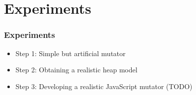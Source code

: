 %
%
\section{Experiments}


\begin{frame}
	\frametitle{Experiments}
	\begin{itemize}
		\item Step 1: Simple but artificial mutator
		\item Step 2: Obtaining a realistic heap model
		\item Step 3: Developing a realistic JavaScript mutator (TODO)
	\end{itemize}
\end{frame}


